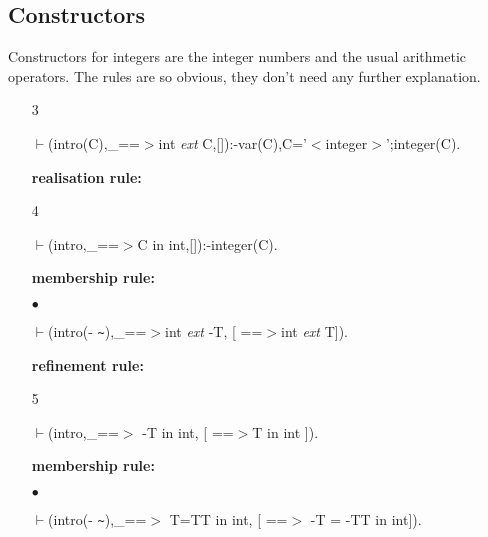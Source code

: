 \documentclass[11pt]{report}
\begin{document}
 \subsection{Constructors}
 Constructors for integers are the integer numbers and the usual
 arithmetic operators. The rules are so obvious, they don't
 need any further explanation.
 \begin{enumerate}
 \item[3]
\begin{sf}\begin{tabbing}
$\vdash$(intro(C),\_\hspace{0.1em}==$>$int \mbox{\it ext} C,[]):-var(C),C='$<$integer$>$';integer(C).
\end{tabbing}\end{sf}

 {\bf realisation rule:} 
  
 \item[4]
\begin{sf}\begin{tabbing}
$\vdash$(intro,\_\hspace{0.1em}==$>$C in int,[]):-integer(C).
\end{tabbing}\end{sf}

 {\bf membership rule:} 
  
 \item[$\bullet$]
\begin{sf}\begin{tabbing}
$\vdash$(intro(- {\verb`~`}),\_\hspace{0.1em}==$>$int \mbox{\it ext} -T, [ ==$>$int \mbox{\it ext} T]).
\end{tabbing}\end{sf}

 {\bf refinement rule:}
  
 \item[5]
\begin{sf}\begin{tabbing}
$\vdash$(intro,\_\hspace{0.1em}==$>$ -T in int, [ ==$>$T in int ]).
\end{tabbing}\end{sf}

 {\bf membership rule:}
  
 \item[$\bullet$]
\begin{sf}\begin{tabbing}
$\vdash$(intro(- {\verb`~`}),\_\hspace{0.1em}==$>$ T=TT in int, [ ==$>$ -T = -TT in int]).
\end{tabbing}\end{sf}


\end{enumerate}
\end{document}
